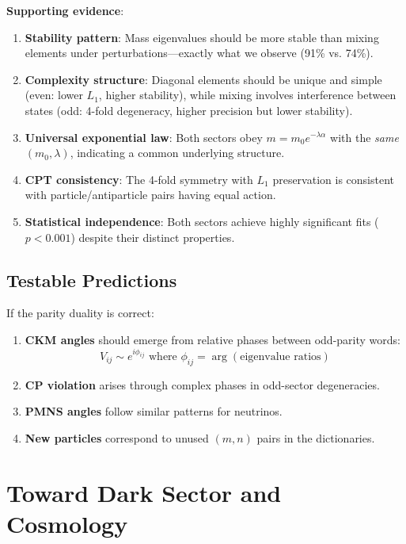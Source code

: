 \documentclass[11pt,a4paper]{article}
\begin{document}
\textbf{Supporting evidence}:
\begin{enumerate}
\item \textbf{Stability pattern}: Mass eigenvalues should be more stable than mixing elements under perturbations—exactly what we observe (91\% vs. 74\%).
\item \textbf{Complexity structure}: Diagonal elements should be unique and simple (even: lower $L_1$, higher stability), while mixing involves interference between states (odd: 4-fold degeneracy, higher precision but lower stability).
\item \textbf{Universal exponential law}: Both sectors obey $m = m_0 e^{-\lambda\alpha}$ with the \emph{same} $(m_0, \lambda)$, indicating a common underlying structure.
\item \textbf{CPT consistency}: The 4-fold symmetry with $L_1$ preservation is consistent with particle/antiparticle pairs having equal action.
\item \textbf{Statistical independence}: Both sectors achieve highly significant fits ($p<0.001$) despite their distinct properties.
\end{enumerate}

\subsection{Testable Predictions}

If the parity duality is correct:

\begin{enumerate}
\item \textbf{CKM angles} should emerge from relative phases between odd-parity words:
\begin{equation}
V_{ij} \sim e^{i\phi_{ij}} \text{ where } \phi_{ij} = \arg(\text{eigenvalue ratios})
\end{equation}
\item \textbf{CP violation} arises through complex phases in odd-sector degeneracies.
\item \textbf{PMNS angles} follow similar patterns for neutrinos.
\item \textbf{New particles} correspond to unused $(m,n)$ pairs in the dictionaries.
\end{enumerate}

\section{Toward Dark Sector and Cosmology}
\end{document}
